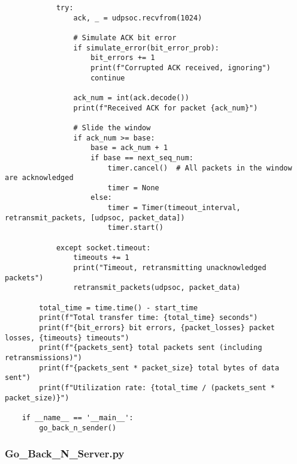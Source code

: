 \documentclass{article}
\begin{document}
\begin{verbatim}
            try:
                ack, _ = udpsoc.recvfrom(1024)
                
                # Simulate ACK bit error
                if simulate_error(bit_error_prob):
                    bit_errors += 1
                    print(f"Corrupted ACK received, ignoring")
                    continue

                ack_num = int(ack.decode())
                print(f"Received ACK for packet {ack_num}")

                # Slide the window
                if ack_num >= base:
                    base = ack_num + 1
                    if base == next_seq_num:
                        timer.cancel()  # All packets in the window are acknowledged
                        timer = None
                    else:
                        timer = Timer(timeout_interval, retransmit_packets, [udpsoc, packet_data])
                        timer.start()

            except socket.timeout:
                timeouts += 1
                print("Timeout, retransmitting unacknowledged packets")
                retransmit_packets(udpsoc, packet_data)

        total_time = time.time() - start_time
        print(f"Total transfer time: {total_time} seconds")
        print(f"{bit_errors} bit errors, {packet_losses} packet losses, {timeouts} timeouts")
        print(f"{packets_sent} total packets sent (including retransmissions)")
        print(f"{packets_sent * packet_size} total bytes of data sent")
        print(f"Utilization rate: {total_time / (packets_sent * packet_size)}")

    if __name__ == '__main__':
        go_back_n_sender()
\end{verbatim}

\subsubsection{Go\_Back\_N\_Server.py}
\end{document}

